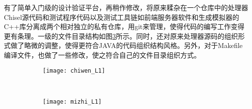 	有了简单入门级的设计验证平台，再稍作修改，将原来糅杂在一个仓库中的处理器Chisel源代码和测试程序代码以及测试工具链如前端服务器软件和生成模拟器的C++库分离成两个相对独立的私有仓库，用git来管理，使得代码的编写工作变得更有条理。一级的文件目录结构如图\ref{fig:project}所示。同时，还对原来处理器源码的组织形式做了略微的调整，使得更符合JAVA的代码组织结构风格。另外，对于Makefile编译文件，也做了一些修改，使之符合自己的文件目录组织方式。
	\begin{figure}[!htbp]
		\centering
		\begin{subfigure}[b]{0.4\textwidth}
			\texttt{[image: chiwen\_L1]}
			\caption{}
			\label{fig:chiwen_L1}
		\end{subfigure}\qquad%
		~%
		\begin{subfigure}[b]{0.4\textwidth}
			\texttt{[image: mizhi\_L1]}
			\caption{}
			\label{fig:mizhi_L1}
		\end{subfigure}
		\label{fig:project}
	\end{figure}

